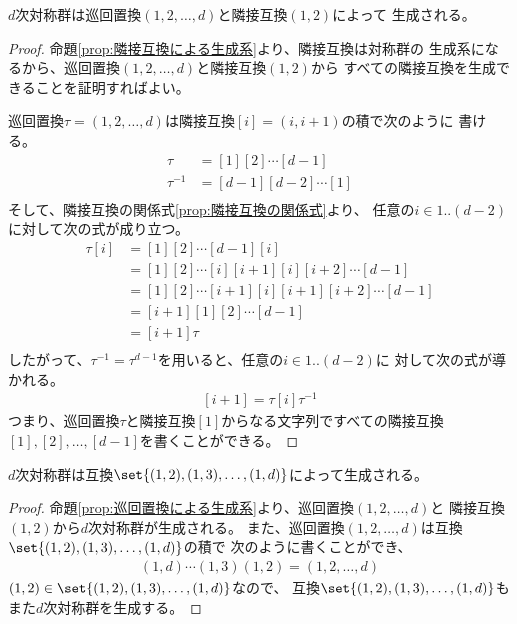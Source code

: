 	\begin{proposition}[巡回置換による生成系]\label{prop:巡回置換による生成系} %
		$d$次対称群は巡回置換$(1,2,\dots,d)$と隣接互換$(1,2)$によって
		生成される。
	\end{proposition} %
	\begin{proof} %
		命題\ref{prop:隣接互換による生成系}より、隣接互換は対称群の
		生成系になるから、巡回置換$(1,2,\dots,d)$と隣接互換$(1,2)$から
		すべての隣接互換を生成できることを証明すればよい。

		巡回置換$\tau=(1,2,\dots,d)$は隣接互換$[i]=(i,i+1)$の積で次のように
		書ける。
		\begin{equation*}\begin{split} %
			\tau &= [1][2]\cdots[d-1] \\
			\tau^{-1} &= [d-1][d-2]\cdots[1] \\
		\end{split}\end{equation*} %
		そして、隣接互換の関係式\ref{prop:隣接互換の関係式}より、
		任意の$i\in1..(d-2)$に対して次の式が成り立つ。
		\begin{equation*}\begin{split} %
			\tau[i] &= [1][2]\cdots[d-1][i] \\
			&= [1][2]\cdots[i][i+1][i][i+2]\cdots[d-1] \\
			&= [1][2]\cdots[i+1][i][i+1][i+2]\cdots[d-1] \\
			&= [i+1][1][2]\cdots[d-1] \\
			&= [i+1]\tau \\
		\end{split}\end{equation*} %
		したがって、$\tau^{-1}=\tau^{d-1}$を用いると、任意の$i\in1..(d-2)$に
		対して次の式が導かれる。
		\begin{equation*}\begin{split} %
			[i+1] = \tau[i]\tau^{-1}
		\end{split}\end{equation*} %
		つまり、巡回置換$\tau$と隣接互換$[1]$からなる文字列ですべての隣接互換
		$[1],[2],\dots,[d-1]$を書くことができる。
	\end{proof} %

	\begin{proposition}[ピボット付き互換による生成系]\label{prop:ピボット付き互換による生成系} %
		$d$次対称群は互換$\set{(1,2),(1,3),\dots,(1,d)}$によって生成される。
	\end{proposition} %
	\begin{proof} %
		命題\ref{prop:巡回置換による生成系}より、巡回置換$(1,2,\dots,d)$と
		隣接互換$(1,2)$から$d$次対称群が生成される。
		また、巡回置換$(1,2,\dots,d)$は互換$\set{(1,2),(1,3),\dots,(1,d)}$の積で
		次のように書くことができ、
		\begin{equation*}\begin{split} %
			(1,d)\cdots(1,3)(1,2) = (1,2,\dots,d)
		\end{split}\end{equation*} %
		$(1,2)\in\set{(1,2),(1,3),\dots,(1,d)}$なので、
		互換$\set{(1,2),(1,3),\dots,(1,d)}$もまた$d$次対称群を生成する。
	\end{proof} %

